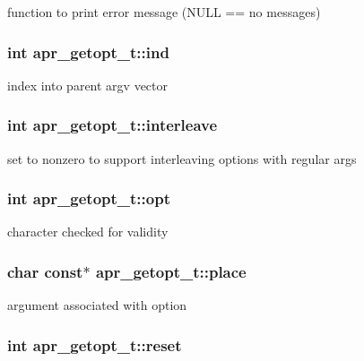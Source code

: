 function to print error message (N\-U\-L\-L == no messages) \hypertarget{structapr__getopt__t_ab04d49d670f095c3244dc9792b70ff07}{
\subsubsection[{ind}]{\setlength{\rightskip}{0pt plus 5cm}int apr\-\_\-getopt\-\_\-t\-::ind}}\label{structapr__getopt__t_ab04d49d670f095c3244dc9792b70ff07}
index into parent argv vector \hypertarget{structapr__getopt__t_a771dbef87345c731845dd63723fb34db}{
\subsubsection[{interleave}]{\setlength{\rightskip}{0pt plus 5cm}int apr\-\_\-getopt\-\_\-t\-::interleave}}\label{structapr__getopt__t_a771dbef87345c731845dd63723fb34db}
set to nonzero to support interleaving options with regular args \hypertarget{structapr__getopt__t_a4f842391b8f8f19e562584fdd29d0654}{
\subsubsection[{opt}]{\setlength{\rightskip}{0pt plus 5cm}int apr\-\_\-getopt\-\_\-t\-::opt}}\label{structapr__getopt__t_a4f842391b8f8f19e562584fdd29d0654}
character checked for validity \hypertarget{structapr__getopt__t_a87961387d1c71bebfbdf69c7f392d2d5}{
\subsubsection[{place}]{\setlength{\rightskip}{0pt plus 5cm}char const$\ast$ apr\-\_\-getopt\-\_\-t\-::place}}\label{structapr__getopt__t_a87961387d1c71bebfbdf69c7f392d2d5}
argument associated with option \hypertarget{structapr__getopt__t_abc4e72bc761666c0b0d9015c3b0de8c3}{
\subsubsection[{reset}]{\setlength{\rightskip}{0pt plus 5cm}int apr\-\_\-getopt\-\_\-t\-::reset}}\label{structapr__getopt__t_abc4e72bc761666c0b0d9015c3b0de8c3}
